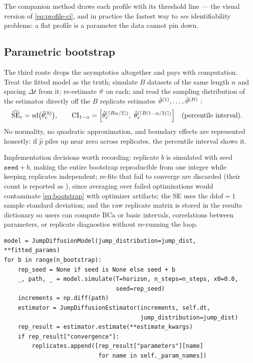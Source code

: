 The companion method  draws each profile with its
threshold line --- the visual version of \eqref{eq:profile-ci}, and in
practice the fastest way to \emph{see} identifiability problems: a flat
profile is a parameter the data cannot pin down.

\subsection{Parametric bootstrap}
\label{sec:bootstrap}

The third route drops the asymptotics altogether and pays with
computation. Treat the fitted model as the truth; simulate $B$ datasets of
the same length $n$ and spacing $\Delta t$ from it; re-estimate
$\vartheta$ on each; and read the sampling distribution of the estimator
directly off the $B$ replicate estimates
$\hat{\vartheta}^{(1)}, \dots, \hat{\vartheta}^{(B)}$
\citep{DavisonHinkley1997}:
\begin{equation}
  \widehat{\mathrm{SE}}_r = \operatorname{sd}\bigl(\hat\theta_r^{(b)}\bigr),
  \qquad
  \mathrm{CI}_{1-\alpha} =
  \Bigl[ \hat\theta_r^{(\lceil B\alpha/2 \rceil)},\
         \hat\theta_r^{(\lceil B(1-\alpha/2) \rceil)} \Bigr]
  \quad \text{(percentile interval)}.
  \label{eq:bootstrap}
\end{equation}
No normality, no quadratic approximation, and boundary effects are
represented honestly: if $\hat p$ piles up near zero across replicates,
the percentile interval shows it.

Implementation decisions worth recording: replicate $b$ is simulated with
seed $\texttt{seed} + b$, making the entire bootstrap reproducible from
one integer while keeping replicates independent; re-fits that fail to
converge are discarded (their count is reported as
), since averaging over failed optimizations would
contaminate \eqref{eq:bootstrap} with optimizer artifacts; the SE uses the
$\mathrm{ddof}=1$ sample standard deviation; and the raw replicate matrix
is stored in the results dictionary so users can compute BCa or basic
intervals, correlations between parameters, or replicate diagnostics
without re-running the loop.

\begin{lstlisting}[caption={The bootstrap loop (excerpt).}]
model = JumpDiffusionModel(jump_distribution=jump_dist, **fitted_params)
for b in range(n_bootstrap):
    rep_seed = None if seed is None else seed + b
    _, path, _ = model.simulate(T=horizon, n_steps=n_steps, x0=0.0,
                                seed=rep_seed)
    increments = np.diff(path)
    estimator = JumpDiffusionEstimator(increments, self.dt,
                                       jump_distribution=jump_dist)
    rep_result = estimator.estimate(**estimate_kwargs)
    if rep_result["convergence"]:
        replicates.append([rep_result["parameters"][name]
                           for name in self._param_names])
\end{lstlisting}

